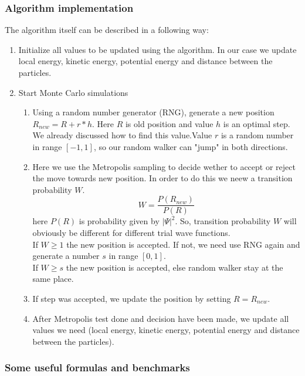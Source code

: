 \documentclass[10pt]{article}
\begin{document}
\subsubsection{Algorithm implementation}
The algorithm itself can be described in a following way:
 \begin{enumerate}
\item Initialize all values to be updated using the algorithm. In our case we update local energy, kinetic energy, potential energy and distance between the particles.
\item Start Monte Carlo simulations
  \begin{enumerate}
  \item Using a random number generator (RNG), generate a new position $R_{new} = R + r*h$. Here $R$ is old position and value $h$ is an optimal step. We already discussed how to find this value.Value $r$ is a random number in range $[-1,1]$, so our random walker can "jump" in both directions. 
  \item Here we use the Metropolis sampling to decide wether to accept or reject the move towards new position. In order to do this we neew a transition probability $W$. 
  \begin{equation}
  W=\frac{P(R_{new})}{P(R)}
  \end{equation}
  here $P(R)$ is probability given by $|\Psi|^2$. So, transition probability $W$ will obviously be different for different trial wave functions.\\
  If $W \geq 1$ the new position is accepted. If not, we need use RNG again and generate a number $s$ in range $[0,1]$. \\
  If $W \geq s$ the new position is accepted, else random walker stay at the same place.
    \item If step was accepted, we update the position by setting $R=R_{new}$.
    \item After Metropolis test done and decision have been made, we update all values we need (local energy, kinetic energy, potential energy and distance between the particles).
\end{enumerate}
\end{enumerate}

\subsubsection{Some useful formulas and benchmarks }
\end{document}
